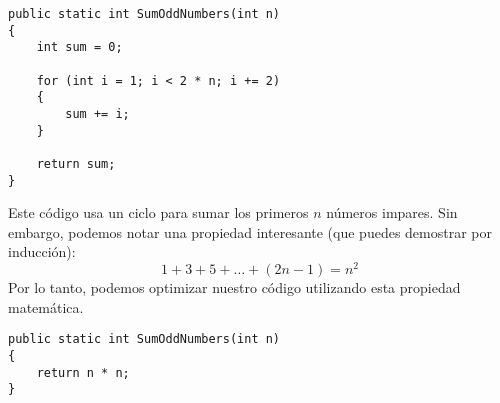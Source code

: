 \begin{lstlisting}
public static int SumOddNumbers(int n)
{
    int sum = 0;
    
    for (int i = 1; i < 2 * n; i += 2)
    {
        sum += i;
    }
    
    return sum;
}
\end{lstlisting}

Este código usa un ciclo para sumar los primeros \(n\) números impares. Sin embargo, podemos notar una propiedad interesante (que puedes demostrar por inducción):
\[
1 + 3 + 5 + \ldots + (2n-1) = n^2
\]
Por lo tanto, podemos optimizar nuestro código utilizando esta propiedad matemática.

\begin{lstlisting}
public static int SumOddNumbers(int n)
{
    return n * n;
}
\end{lstlisting}